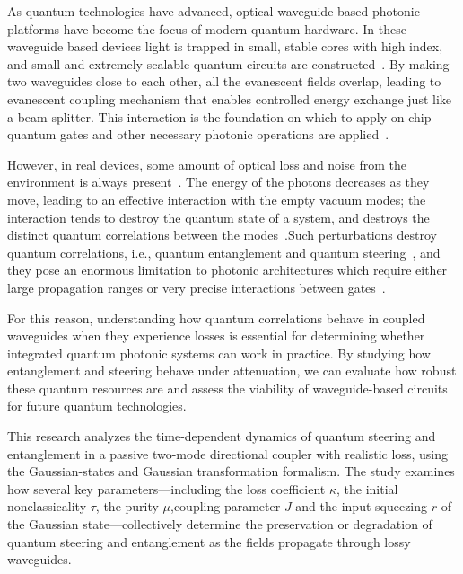 As quantum technologies have advanced, optical waveguide-based photonic platforms have become the focus of modern quantum hardware. In these waveguide based devices light is trapped in small, stable cores with high index, and small and extremely scalable quantum circuits are constructed~\cite{Politi2008,OBrien2009}. By making two waveguides close to each other, all the evanescent fields overlap, leading to evanescent coupling mechanism that enables controlled energy exchange just like a beam splitter. This interaction is the foundation on which to apply on-chip quantum gates and other necessary photonic operations are applied~\cite{Rai2010,Politi2008,OBrien2009}.

However, in real devices, some amount of optical loss and noise from the environment
is always present~\cite{BreuerPetruccione2002}. The energy of the photons decreases as they move, leading to an effective interaction with the empty vacuum modes; the interaction tends to destroy the quantum state of a system, and destroys the distinct quantum correlations between the modes~\cite{GardinerZoller2004,BreuerPetruccione2002}.Such perturbations destroy quantum correlations, i.e., quantum entanglement and quantum steering~\cite{Horodecki2009,Uola2020}, and they pose an enormous limitation to photonic architectures which require either large propagation ranges or very precise interactions between gates~\cite{Rai2010,Weedbrook2012,ChenLiuKoehlerTabatabaeiGuoSunYangWangBelingYi2025}.

For this reason, understanding how quantum correlations behave in coupled waveguides
when they experience losses is essential for determining whether integrated quantum
photonic systems can work in practice. By studying how entanglement and steering
behave under attenuation, we can evaluate how robust these quantum resources are
and assess the viability of waveguide-based circuits for future quantum technologies.

This research analyzes the time-dependent dynamics of quantum steering and entanglement
in a passive two-mode directional coupler with realistic loss, using the Gaussian-states and Gaussian transformation
formalism. The study examines how several key parameters—including the loss coefficient
$\kappa$, the initial nonclassicality  $\tau$, the purity $\mu$,coupling parameter $J$ and the input squeezing $r$
of the Gaussian state—collectively determine the preservation or degradation of quantum
steering and entanglement as the fields propagate through lossy waveguides.

